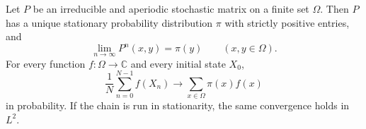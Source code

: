 \begin{proposition}
\label{prop:finite-state-markov-ergodic-theorem}
Let \(P\) be an irreducible and aperiodic stochastic matrix on a finite set
\(\Omega\).  Then \(P\) has a unique stationary probability distribution
\(\pi\) with strictly positive entries, and
\begin{equation}
  \lim_{n\to\infty}P^n(x,y)=\pi(y)
  \qquad (x,y\in\Omega).
  \label{eq:finite-chain-pointwise-convergence}
\end{equation}
For every function \(f:\Omega\to\mathbb C\) and every initial state \(X_0\),
\begin{equation}
  \frac1N\sum_{n=0}^{N-1}f(X_n)
  \longrightarrow
  \sum_{x\in\Omega}\pi(x)f(x)
  \label{eq:finite-chain-time-average-convergence}
\end{equation}
in probability.  If the chain is run in stationarity, the same convergence
holds in \(L^2\).
\end{proposition}

